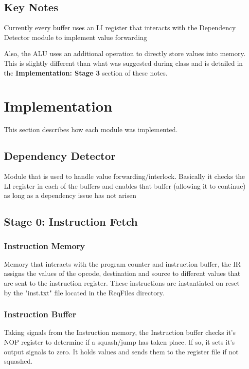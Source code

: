 \documentclass[conference]{IEEEtran}
\begin{document}
\subsection{Key Notes}
Currently every buffer uses an LI register that interacts with the Dependency
Detector module to implement value forwarding

Also, the ALU uses an additional operation to directly store values into 
memory. This is slightly different than what was suggested during class 
and is detailed in the \textbf{Implementation: Stage 3} section of these 
notes. 

\section{Implementation}
This section describes how each module was implemented.

\subsection{Dependency Detector}
Module that is used to handle value forwarding/interlock. Basically it checks
the LI register in each of the buffers and enables that buffer (allowing it to 
continue) as long as a dependency issue has not arisen 

\subsection{Stage 0: Instruction Fetch}
\subsubsection{Instruction Memory}
Memory that interacts with the program counter and instruction buffer, the IR assigns
the values of the opcode, destination and source to different values that are sent 
to the instruction register. These instructions are instantiated on reset by the "inst.txt"
file located in the ReqFiles directory.

\subsubsection{Instruction Buffer}
Taking signals from the Instruction memory, the Instruction buffer checks it's NOP
register to determine if a squash/jump has taken place. If so, it sets it's output 
signals to zero. It holds values and sends them to the register file if not squashed.
\end{document}
